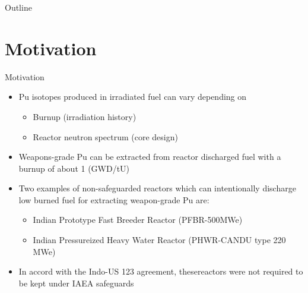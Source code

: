 \documentclass{beamer}
\begin{document}



\begin{frame}{Outline}
\tableofcontents
\end{frame}

\section{Motivation}
\begin{frame}{Motivation}
\begin{itemize}
\item{Pu isotopes produced in irradiated fuel can vary depending on}
  \begin{itemize}
  \item{Burnup (irradiation history)}
  \item{Reactor neutron spectrum (core design)}
  \end{itemize}
\item{Weapons-grade Pu can be extracted from reactor discharged fuel
  with a burnup of about 1 (GWD/tU)}
\item{Two examples of non-safeguarded reactors which can intentionally
  discharge low burned fuel for extracting weapon-grade Pu are:}
  \begin{itemize}
  \item{Indian Prototype Fast Breeder Reactor (PFBR-500MWe)}
  \item{Indian \coAsterisk Pressureized Heavy Water Reactor (PHWR-CANDU type 220 MWe)}
  \end{itemize}
\item{In accord with the Indo-US 123 agreement, thesereactors were not
      required to be kept under IAEA safeguards}
\end{itemize}
\end{frame}
\end{document}
